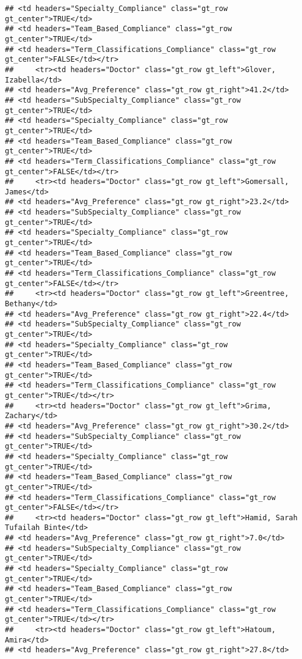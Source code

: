 \documentclass[
]{article}
\begin{document}
\begin{verbatim}
## <td headers="Specialty_Compliance" class="gt_row gt_center">TRUE</td>
## <td headers="Team_Based_Compliance" class="gt_row gt_center">TRUE</td>
## <td headers="Term_Classifications_Compliance" class="gt_row gt_center">FALSE</td></tr>
##     <tr><td headers="Doctor" class="gt_row gt_left">Glover, Izabella</td>
## <td headers="Avg_Preference" class="gt_row gt_right">41.2</td>
## <td headers="SubSpecialty_Compliance" class="gt_row gt_center">TRUE</td>
## <td headers="Specialty_Compliance" class="gt_row gt_center">TRUE</td>
## <td headers="Team_Based_Compliance" class="gt_row gt_center">TRUE</td>
## <td headers="Term_Classifications_Compliance" class="gt_row gt_center">FALSE</td></tr>
##     <tr><td headers="Doctor" class="gt_row gt_left">Gomersall, James</td>
## <td headers="Avg_Preference" class="gt_row gt_right">23.2</td>
## <td headers="SubSpecialty_Compliance" class="gt_row gt_center">TRUE</td>
## <td headers="Specialty_Compliance" class="gt_row gt_center">TRUE</td>
## <td headers="Team_Based_Compliance" class="gt_row gt_center">TRUE</td>
## <td headers="Term_Classifications_Compliance" class="gt_row gt_center">FALSE</td></tr>
##     <tr><td headers="Doctor" class="gt_row gt_left">Greentree, Bethany</td>
## <td headers="Avg_Preference" class="gt_row gt_right">22.4</td>
## <td headers="SubSpecialty_Compliance" class="gt_row gt_center">TRUE</td>
## <td headers="Specialty_Compliance" class="gt_row gt_center">TRUE</td>
## <td headers="Team_Based_Compliance" class="gt_row gt_center">TRUE</td>
## <td headers="Term_Classifications_Compliance" class="gt_row gt_center">TRUE</td></tr>
##     <tr><td headers="Doctor" class="gt_row gt_left">Grima, Zachary</td>
## <td headers="Avg_Preference" class="gt_row gt_right">30.2</td>
## <td headers="SubSpecialty_Compliance" class="gt_row gt_center">TRUE</td>
## <td headers="Specialty_Compliance" class="gt_row gt_center">TRUE</td>
## <td headers="Team_Based_Compliance" class="gt_row gt_center">TRUE</td>
## <td headers="Term_Classifications_Compliance" class="gt_row gt_center">FALSE</td></tr>
##     <tr><td headers="Doctor" class="gt_row gt_left">Hamid, Sarah Tufailah Binte</td>
## <td headers="Avg_Preference" class="gt_row gt_right">7.0</td>
## <td headers="SubSpecialty_Compliance" class="gt_row gt_center">TRUE</td>
## <td headers="Specialty_Compliance" class="gt_row gt_center">TRUE</td>
## <td headers="Team_Based_Compliance" class="gt_row gt_center">TRUE</td>
## <td headers="Term_Classifications_Compliance" class="gt_row gt_center">TRUE</td></tr>
##     <tr><td headers="Doctor" class="gt_row gt_left">Hatoum, Amira</td>
## <td headers="Avg_Preference" class="gt_row gt_right">27.8</td>

\end{verbatim}
\end{document}
